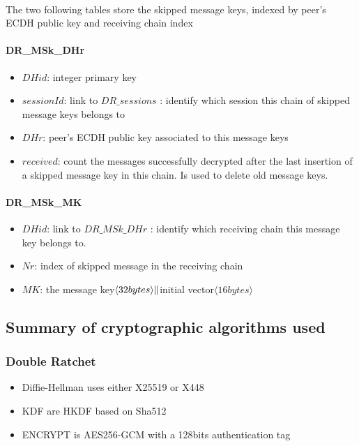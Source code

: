 \documentclass[a4paper,11pt]{article}
\begin{document}
    \paragraph*{}The two following tables store the skipped message keys, indexed by peer's ECDH public key and receiving chain index
    \paragraph*{DR\_MSk\_DHr}
    \begin{itemize}
      \item $DHid$: integer primary key
      \item $sessionId$: link to $DR\_sessions$ : identify which session this chain of skipped message keys belongs to
      \item $DHr$: peer's ECDH public key associated to this message keys
      \item $received$: count the messages successfully decrypted after the last insertion of a skipped message key in this chain. Is used to delete old message keys.
    \end{itemize}

    \paragraph*{DR\_MSk\_MK}
    \begin{itemize}
      \item $DHid$: link to $DR\_MSk\_DHr$ : identify which receiving chain this message key belongs to.
      \item $Nr$: index of skipped message in the receiving chain
      \item $MK$: the message key$\langle 32bytes\rangle  \Arrowvert $initial vector$\langle 16bytes\rangle $
    \end{itemize}
  

    
  \subsection{Summary of cryptographic algorithms used}
    \subsubsection{Double Ratchet}
      \begin{itemize}
        \item Diffie-Hellman uses either X25519 or X448
        \item KDF are HKDF\cite{rfc5869} based on Sha512
        \item ENCRYPT is AES256-GCM with a 128bits authentication tag
      \end{itemize}
\end{document}
